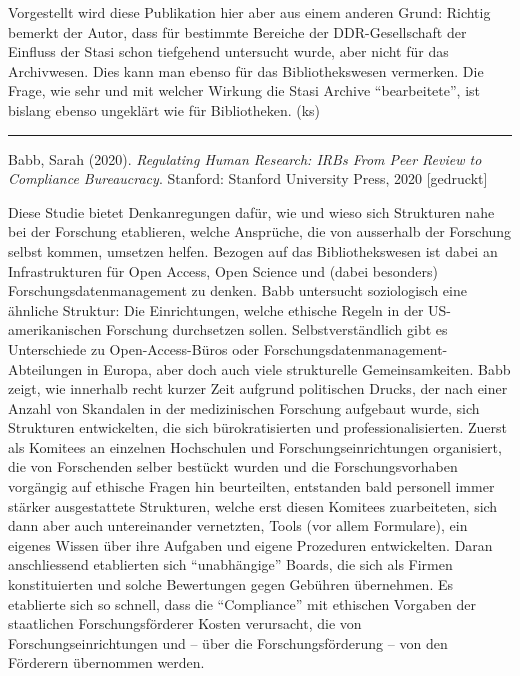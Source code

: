 \documentclass[a4paper,
fontsize=11pt,
oneside,
numbers=noperiodatend,
parskip=half-,
bibliography=totoc,
final
]{scrartcl}
\begin{document}
Vorgestellt wird diese Publikation hier aber aus einem anderen Grund:
Richtig bemerkt der Autor, dass für bestimmte Bereiche der
DDR-Gesellschaft der Einfluss der Stasi schon tiefgehend untersucht
wurde, aber nicht für das Archivwesen. Dies kann man ebenso für das
Bibliothekswesen vermerken. Die Frage, wie sehr und mit welcher Wirkung
die Stasi Archive \enquote{bearbeitete}, ist bislang ebenso ungeklärt
wie für Bibliotheken. (ks)

\begin{center}\rule{0.5\linewidth}{0.5pt}\end{center}

Babb, Sarah (2020). \emph{Regulating Human Research: IRBs From Peer
Review to Compliance Bureaucracy}. Stanford: Stanford University Press,
2020 {[}gedruckt{]}

Diese Studie bietet Denkanregungen dafür, wie und wieso sich Strukturen
nahe bei der Forschung etablieren, welche Ansprüche, die von ausserhalb
der Forschung selbst kommen, umsetzen helfen. Bezogen auf das
Bibliothekswesen ist dabei an Infrastrukturen für Open Access, Open
Science und (dabei besonders) Forschungsdatenmanagement zu denken. Babb
untersucht soziologisch eine ähnliche Struktur: Die Einrichtungen,
welche ethische Regeln in der US-amerikanischen Forschung durchsetzen
sollen. Selbstverständlich gibt es Unterschiede zu Open-Access-Büros
oder Forschungsdatenmanagement-Abteilungen in Europa, aber doch auch
viele strukturelle Gemeinsamkeiten. Babb zeigt, wie innerhalb recht
kurzer Zeit aufgrund politischen Drucks, der nach einer Anzahl von
Skandalen in der medizinischen Forschung aufgebaut wurde, sich
Strukturen entwickelten, die sich bürokratisierten und
professionalisierten. Zuerst als Komitees an einzelnen Hochschulen und
Forschungseinrichtungen organisiert, die von Forschenden selber bestückt
wurden und die Forschungsvorhaben vorgängig auf ethische Fragen hin
beurteilten, entstanden bald personell immer stärker ausgestattete
Strukturen, welche erst diesen Komitees zuarbeiteten, sich dann aber
auch untereinander vernetzten, Tools (vor allem Formulare), ein eigenes
Wissen über ihre Aufgaben und eigene Prozeduren entwickelten. Daran
anschliessend etablierten sich \enquote{unabhängige} Boards, die sich
als Firmen konstituierten und solche Bewertungen gegen Gebühren
übernehmen. Es etablierte sich so schnell, dass die \enquote{Compliance}
mit ethischen Vorgaben der staatlichen Forschungsförderer Kosten
verursacht, die von Forschungseinrichtungen und -- über die
Forschungsförderung -- von den Förderern übernommen werden.
\end{document}
